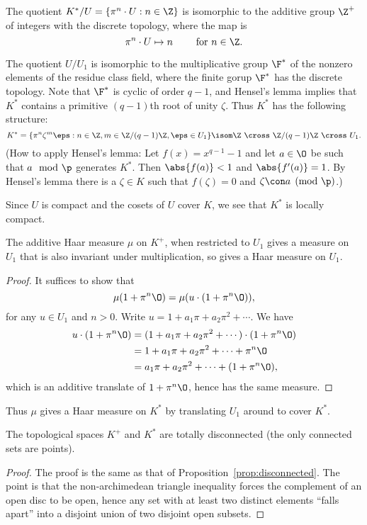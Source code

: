   The quotient $K^*/U = \{ \pi^n \cdot U : n \in \Z\}$ is isomorphic to the additive group $\Z^+$
of integers with the discrete topology, where the map is 
$$
 \pi^n\cdot U \mapsto n  \qquad \text{ for } n\in\Z.
 $$

The quotient
 $U/U_1$ is isomorphic to the multiplicative group $\F^*$ of the
 nonzero elements of the residue class field, where the finite gorup
 $\F^*$ has the discrete topology.  
Note that $\F^*$ is cyclic
 of order $q-1$, and Hensel's lemma implies that $K^*$ contains a
 primitive $(q-1)$th root of unity $\zeta$.  Thus $K^*$ has
the following structure:
$$
K^* = \{ \pi^n\zeta^m\eps : n\in \Z, m\in\Z/(q-1)\Z, \eps\in U_1\}
\isom \Z\,\, \cross\,\, \Z/(q-1)\Z \,\,\cross\,\, U_1.
$$
(How to apply Hensel's lemma: Let $f(x) = x^{q-1}-1$ and let
$a\in\O$ be such that $a\mod\p$ generates $K^*$.  Then $\abs{f(a)}<1$
and $\abs{f'(a)}=1$.  By Hensel's lemma  there is a
$\zeta\in K$ such that $f(\zeta)=0$ and $\zeta\con a\pmod{\p}$.)

Since $U$ is compact and the cosets of $U$ cover $K$, we see that
$K^*$ is locally compact.  
\begin{lemma}
The additive Haar measure $\mu$ on $K^+$,
when restricted to $U_1$ gives a measure on $U_1$ that is also
invariant under multiplication, so gives a Haar measure on $U_1$.
\end{lemma}
\begin{proof}
It suffices to show that
$$\mu(1+\pi^n\O) = \mu(u\cdot(1+\pi^n\O)),$$ 
for any $u\in U_1$ and $n>0$.
Write $u=1+a_1\pi + a_2\pi^2 +\cdots$.
We have
\begin{align*}
 u\cdot (1+\pi^n\O) &= (1+a_1\pi + a_2\pi^2 +\cdots)\cdot (1+\pi^n\O)\\
  &= 1+a_1\pi + a_2\pi^2 + \cdots + \pi^n\O\\
  &= a_1\pi + a_2\pi^2 + \cdots + ( 1+\pi^n\O),
\end{align*}
which is an additive translate of $1+\pi^n\O$, hence has the
same measure. 
\end{proof}
Thus $\mu$ gives a Haar measure on $K^*$ by translating $U_1$ around
to cover $K^*$.

\begin{lemma}
The topological spaces $K^+$ and $K^*$ are totally disconnected (the
only connected sets are points).
\end{lemma}
\begin{proof}
  The proof is the same as that of
  Proposition~\ref{prop:disconnected}.  The point is that the
  non-archimedean triangle inequality forces the complement of an open
  disc to be open, hence any set with at least two distinct elements
  ``falls apart'' into a disjoint union of two disjoint open subsets.
\end{proof}

